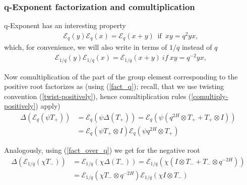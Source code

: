 \documentclass{article}
\newcommand{\lb}{\left (}
\newcommand{\rb}{\right )}
\newcommand{\lsb}{\left [}
\newcommand{\rsb}{\right ]}
\newcommand{\be}{\begin{eqnarray}}
\newcommand{\ee}{\end{eqnarray}}
\DeclareMathOperator{\If}{if}
\newcommand {\?}{\textit{???}}
\newcommand{\me}[0]{\mathcal{E}}
\def\dg{\Delta (g)}
\def\gog{g \otimes g}
\newcommand{\comul}[1]{\Delta \lb #1 \rb}
\newcommand{\delabel}[1]{(\ref{#1})}
\begin{document}



\subsubsection{q-Exponent factorization and comultiplication}
q-Exponent has an interesting property
\be
\me_q(y)\me_q(x) = \me_q(x + y)\ \If \ xy = q^2 yx, \label{fact_q}
\ee
which, for convenience, we will also write in terms of $1/q$ instead of $q$
\be
\me_{1/q}(y)\me_{1/q}(x) = \me_{1/q}(x + y)\ if\ xy = q^{-2} yx, \label{fact_over_q}
\ee

Now comultiplication of the part of the group element corresponding to the positive root factorizes as
(using \delabel{fact_q}; recall, that we use twisting convention \delabel{twist-positively}, hence
comultiplication rules \delabel{comultiply-positively} apply)
\be
\label{comul-expt-positive-sl2}
\comul{\me_q \lb \psi T_+ \rb} & = \me_q \lb \psi \comul{T_+}\rb = \me_q \lb \psi \lb q^{2H} \otimes T_+ + T_+ \otimes I \rb \rb & \\
& = \me_q \lb \psi T_+ \otimes I\rb \me_q \lb \psi q^{2H} \otimes T_+\rb \nonumber
\ee

Analogously, using (\ref{fact_over_q}) we get for the negative root
\be
\label{comul-expt-negative-sl2}
\comul{\me_{1/q} \lb \chi T_- \rb} & = \me_{1/q} \lb \chi \comul{T_-}\rb = \me_{1/q} \lb \chi \lb I \otimes T_- + T_- \otimes q^{-2H} \rb \rb & \\
& = \me_{1/q} \lb \chi T_- \otimes q^{-2H}\rb \me_{1/q} \lb \chi I \otimes T_-\rb \nonumber
\ee
\end{document}
